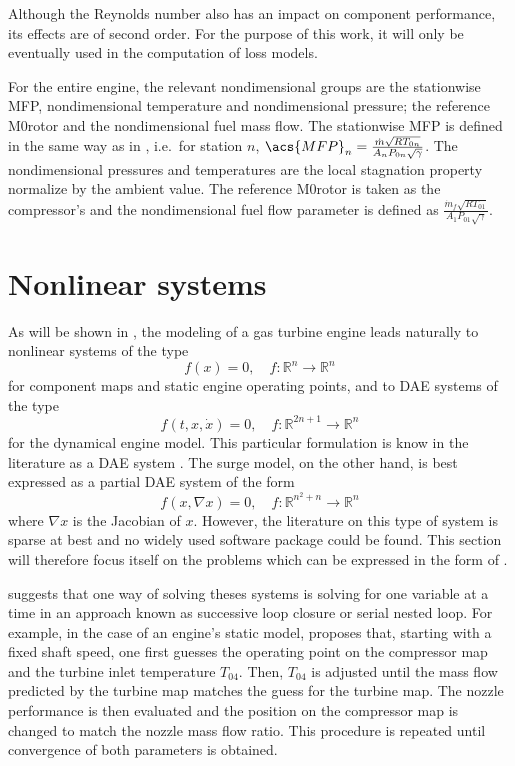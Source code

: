 Although the Reynolds number also has an impact on component performance, 
its effects are of second order\cite{walsh2004gas}. 
For the purpose of this work, it will only be eventually used in the computation of loss models.

For the entire engine, the relevant nondimensional groups are the stationwise
\acl{MFP}, nondimensional temperature and nondimensional pressure;
the reference \acl{M0rotor} and the nondimensional fuel mass flow. 
The stationwise \acl{MFP} is defined in the same way as in , 
i.e.\ for station $n$, $\acs{MFP}_n = \MFP{n}$. 
The nondimensional pressures and temperatures are the local stagnation property normalize by the ambient value. The reference \acl{M0rotor} is taken as the compressor's 
and the nondimensional fuel flow parameter is defined as 
$\frac{\dot{m}_f \sqrt{RT_{01}}}{A_1 P_{01} \sqrt{\gamma}}$.

\section{Nonlinear systems}
\label{sec:review:numeric}

As will be shown in , the modeling of a gas turbine engine leads naturally to nonlinear systems of the type 
\begin{equation}
    \label{eqn:nonlinear}
    f(x) = 0, \quad f:\mathbb{R}^n \rightarrow \mathbb{R}^n
\end{equation}
for component maps and static engine operating points, and to \acl{DAE} systems of the type
\begin{equation}
    \label{eqn:dae}
    f(t, x, \dot{x}) = 0, \quad f:\mathbb{R}^{2n+1} \rightarrow \mathbb{R}^n
\end{equation}
for the dynamical engine model. 
This particular formulation is know in the literature as a \ac{DAE} system \cite{Brenan1995}.
The surge model, on the other hand, is best expressed as a partial \acl{DAE} system of the form
\begin{equation}
    f(x, \nabla x) = 0, \quad f:\mathbb{R}^{n^2+n} \rightarrow \mathbb{R}^n
\end{equation}
where $\nabla x$ is the Jacobian of $x$. 
However, the literature on this type of system is sparse at best and no widely used software package could be found.
This section will therefore focus itself on the problems which can be expressed in the form of .

\textcite{walsh2004gas} suggests that one way of solving theses systems is solving for one variable at a time in an approach known as successive loop closure or serial nested loop. 
For example, in the case of an engine's static model, \textcite{walsh2004gas} proposes that, starting with a fixed shaft speed, one first guesses the operating point on the compressor map and the turbine inlet temperature $T_{04}$. Then, $T_04$ is adjusted until the mass flow predicted by the turbine map matches the guess for the turbine map. The nozzle performance is then evaluated and the position on the compressor map is changed to match the nozzle mass flow ratio. This procedure is repeated until convergence of both parameters is obtained.

